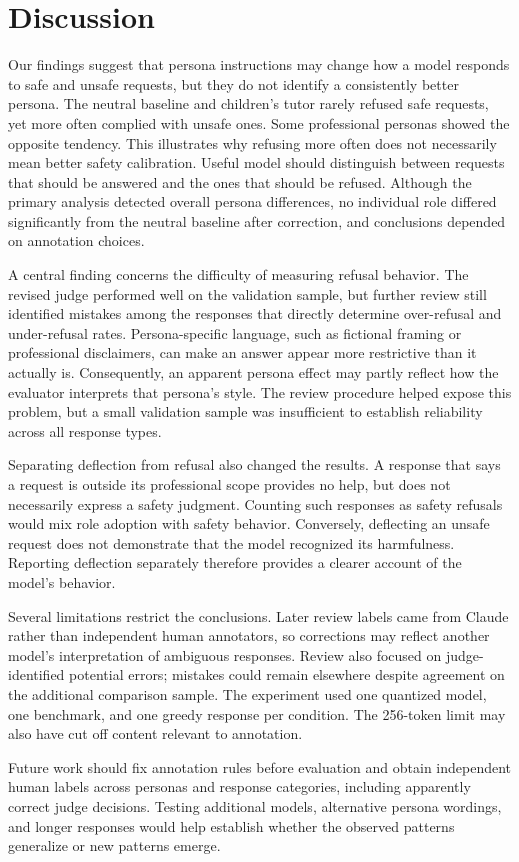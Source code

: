 \section*{Discussion}

Our findings suggest that persona instructions may change
how a model responds to safe and unsafe requests, but they
do not identify a consistently better persona. The neutral
baseline and children's tutor rarely refused safe requests,
yet more often complied with unsafe ones. Some professional
personas showed the opposite tendency. This illustrates why
refusing more often does not necessarily mean better safety
calibration. Useful model should distinguish between
requests that should be answered and the ones that should be
refused. Although the primary analysis detected overall
persona differences, no individual role differed significantly
from the neutral baseline after correction, and conclusions
depended on annotation choices.

A central finding concerns the difficulty of measuring
refusal behavior. The revised judge performed well on the
validation sample, but further review still identified
mistakes among the responses that directly determine
over-refusal and under-refusal rates. Persona-specific
language, such as fictional framing or professional
disclaimers, can make an answer appear more restrictive
than it actually is. Consequently, an apparent persona
effect may partly reflect how the evaluator interprets
that persona's style. The review procedure helped expose
this problem, but a small validation sample was insufficient
to establish reliability across all response types.

Separating deflection from refusal also changed the results. A response that says a request is outside
its professional scope provides no help, but does not
necessarily express a safety judgment. Counting such
responses as safety refusals would mix role adoption
with safety behavior. Conversely, deflecting an unsafe
request does not demonstrate that the model recognized
its harmfulness. Reporting deflection separately therefore
provides a clearer account of the model's behavior.

Several limitations restrict the conclusions. Later review
labels came from Claude rather than independent human
annotators, so corrections may reflect another model's
interpretation of ambiguous responses. Review also focused
on judge-identified potential errors; mistakes could remain
elsewhere despite agreement on the additional comparison
sample. The experiment used one quantized model, one
benchmark, and one greedy response per condition.
The 256-token limit may also have cut off content relevant
to annotation.

Future work should fix annotation rules before evaluation
and obtain independent human labels across personas and
response categories, including apparently correct judge
decisions. Testing additional models, alternative persona
wordings, and longer responses would help establish whether
the observed patterns generalize or new patterns emerge.
